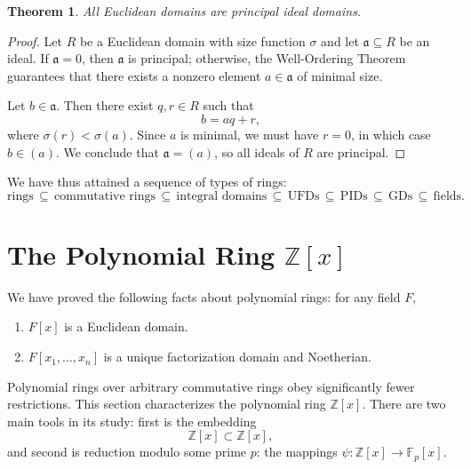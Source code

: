 \documentclass[11pt]{article}
\newtheorem{theorem}{Theorem}
\begin{document}
\begin{adjustwidth}{0.5cm}{}
  \begin{theorem}
    All Euclidean domains are principal ideal domains.
  \end{theorem}
  \begin{proof}
    Let $R$ be a Euclidean domain with size function $\sigma$ and let $\mathfrak{a} \subseteq R$ be an ideal. If $\mathfrak{a} = 0$, then $\mathfrak{a}$ is principal; otherwise, the Well-Ordering Theorem guarantees that there exists a nonzero element $a \in \mathfrak{a}$ of minimal size.

    Let $b \in \mathfrak{a}$. Then there exist $q, r \in R$ such that
    \[
      b = aq + r,
    \]
    where $\sigma(r) < \sigma(a)$. Since $a$ is minimal, we must have $r = 0$, in which case $b \in (a)$. We conclude that $\mathfrak{a} = (a)$, so all ideals of $R$ are principal.
  \end{proof}
\end{adjustwidth}

We have thus attained a sequence of types of rings:
\[
  \text{rings} \, \subseteq \, \text{commutative rings} \, \subseteq \, \text{integral domains} \, \subseteq \, \text{UFDs} \, \subseteq \, \text{PIDs} \, \subseteq \, \text{GDs} \, \subseteq \, \text{fields}.
\]


\section{The Polynomial Ring \texorpdfstring{$\mathbb{Z}[x]$}{Z[x]}}

We have proved the following facts about polynomial rings: for any field $F$,
\begin{enumerate}
  \item $F[x]$ is a Euclidean domain.
  \item $F[x_{1}, \ldots, x_{n}]$ is a unique factorization domain and Noetherian.
\end{enumerate}
Polynomial rings over arbitrary commutative rings obey significantly fewer restrictions. This section characterizes the polynomial ring $\mathbb{Z}[x]$. There are two main tools in its study: first is the embedding
\[
  \mathbb{Z}[x] \subset \mathbb{Z}[x],
\]
and second is reduction modulo some prime $p$: the mappings $\psi : \mathbb{Z}[x] \to \mathbb{F}_{p}[x]$.

\end{document}
